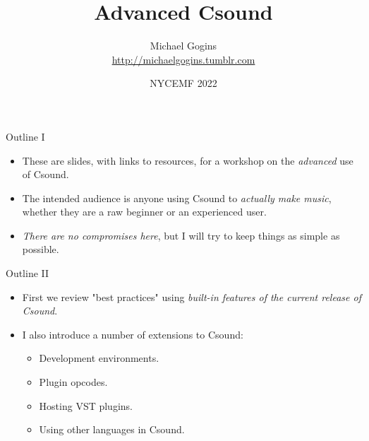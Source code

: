 \documentclass{beamer}
\title{Advanced Csound}
\author[Gogins] %
{Michael Gogins \\ \url{http://michaelgogins.tumblr.com} }
\institute[Irreducible Productions] %
{
    Irreducible Productions\\
    New York
}
\date[NYCEMF 2022] %
{NYCEMF 2022}
\begin{document}
    
    \begin{frame}
        \titlepage
    \end{frame}
    
    \begin{frame}{Outline I}
        \begin{itemize}
            \item These are slides, with links to resources, for a workshop on the
            \textit{advanced} use of Csound.
            \item The intended audience is anyone using Csound to \textit{actually make
                music}, whether they are a raw beginner or an experienced user.           
             \item \textit{There are no compromises here}, but I will try to keep things
            as simple as possible.
        \end{itemize}
    \end{frame}
    
    \begin{frame}{Outline II}
        \begin{itemize}
           \item First we review "best practices" using \textit{built-in features of
            the current release of Csound}.
            \item I also introduce a number of extensions to Csound: 
                \begin{itemize}
                    \item Development environments.
                    \item Plugin opcodes.
                    \item Hosting VST plugins.
                    \item Using other languages in Csound.
                \end{itemize}
        \end{itemize}
    \end{frame}
    
\end{document}
